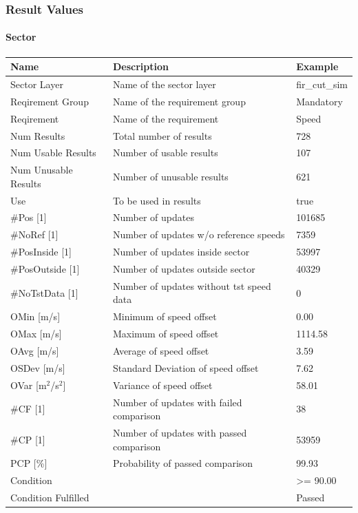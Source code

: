 \subsubsection{Result Values}

\paragraph{Sector}

\begin{center}
 \begin{table}[H]
  \begin{tabularx}{\textwidth}{ | l | X |  l | }
    \hline
    \textbf{Name} & \textbf{Description} & \textbf{Example} \\ \hline
    Sector Layer & Name of the sector layer & fir\_cut\_sim \\ \hline
    Reqirement Group & Name of the requirement group & Mandatory \\ \hline
    Reqirement & Name of the requirement & Speed \\ \hline
    Num Results & Total number of results & 728 \\ \hline
    Num Usable Results & Number of usable results & 107 \\ \hline
    Num Unusable Results & Number of unusable results & 621 \\ \hline
    Use & To be used in results & true \\ \hline
    \#Pos [1] & Number of updates & 101685 \\ \hline
    \#NoRef [1] & Number of updates w/o reference speeds & 7359 \\ \hline
    \#PosInside [1] & Number of updates inside sector & 53997 \\ \hline
    \#PosOutside [1] & Number of updates outside sector & 40329 \\ \hline
    \#NoTstData [1] & Number of updates without tst speed data & 0 \\ \hline
    OMin [m/s] & Minimum of speed offset & 0.00 \\ \hline
    OMax [m/s] & Maximum of speed offset & 1114.58 \\ \hline
    OAvg [m/s] & Average of speed offset & 3.59 \\ \hline
    OSDev [m/s] & Standard Deviation of speed offset & 7.62 \\ \hline
    OVar [m$^2$/s$^2$] & Variance of speed offset & 58.01 \\ \hline
    \#CF [1] & Number of updates with failed comparison & 38 \\ \hline
    \#CP [1] & Number of updates with passed comparison  & 53959 \\ \hline
    PCP [\%] & Probability of passed comparison & 99.93 \\ \hline
    Condition &  & >= 90.00 \\ \hline
    Condition Fulfilled &  & Passed \\ \hline
\end{tabularx}
\end{table}
\end{center}

